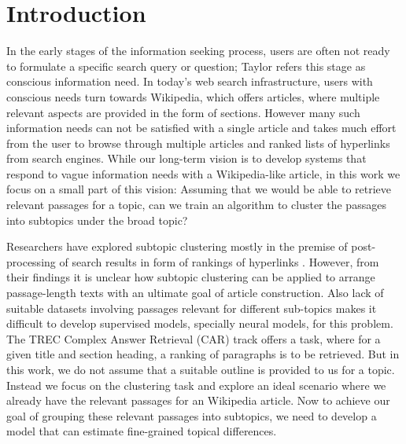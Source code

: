 \documentclass[sigconf,authordraft]{acmart}
\begin{document}



\maketitle

\section{Introduction}
In the early stages of the information seeking process, users are often not ready to formulate a specific search query or question; Taylor\cite{taylor2015question} refers this stage as conscious information need. In today's web search infrastructure, users with conscious needs turn towards Wikipedia, which offers articles, where multiple relevant aspects are provided in the form of sections. However many such information needs can not be satisfied with a single article and takes much effort from the user to browse through multiple articles and ranked lists of hyperlinks from search engines. While our long-term vision is to develop systems that respond to vague information needs with a Wikipedia-like article, in this work we focus on a small part of this vision: Assuming that we would be able to retrieve relevant passages for a topic, can we train an algorithm to cluster the passages into subtopics under the broad topic? \par
Researchers have explored subtopic clustering mostly in the premise of post-processing of search results in form of rankings of hyperlinks \cite{bernardini2009full, carpineto2012evaluating}. However, from their findings it is unclear how subtopic clustering can be applied to arrange passage-length texts with an ultimate goal of article construction. Also lack of suitable datasets involving passages relevant for different sub-topics makes it difficult to develop supervised models, specially neural models, for this problem. The TREC Complex Answer Retrieval (CAR)\cite{dietz2017trec} track offers a task, where for a given title and section heading, a ranking of paragraphs is to be retrieved. But in this work, we do not assume that a suitable outline is provided to us for a topic. Instead we focus on the clustering task and explore an ideal scenario where we already have the relevant passages for an Wikipedia article. Now to achieve our goal of grouping these relevant passages into subtopics, we need to develop a model that can estimate fine-grained topical differences.
\end{document}

